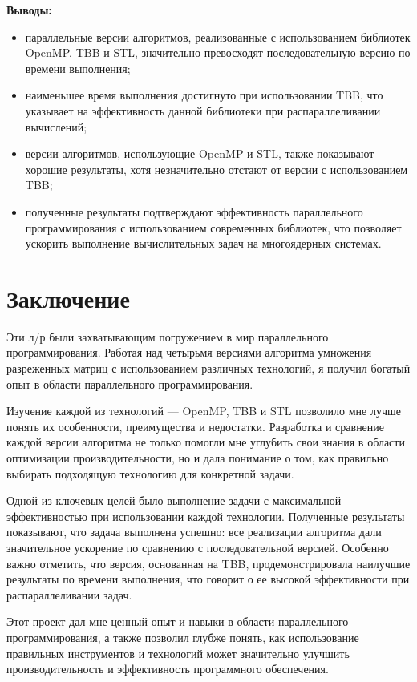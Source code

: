 \documentclass[a4paper, 14pt]{article}
\theoremstyle{plain}
\begin{document}
\textbf{Выводы:}
\vspace{-1em}
\begin{itemize}[leftmargin=3em]
	\setlength\itemsep{0cm}
	\item параллельные версии алгоритмов, реализованные с использованием библиотек OpenMP, TBB и STL, значительно превосходят последовательную версию по времени выполнения;
	\item наименьшее время выполнения достигнуто при использовании TBB, что указывает на эффективность данной библиотеки при распараллеливании вычислений;
	\item версии алгоритмов, использующие OpenMP и STL, также показывают хорошие результаты, хотя незначительно отстают от версии с использованием TBB;
	\item полученные результаты подтверждают эффективность параллельного программирования с использованием современных библиотек, что позволяет ускорить выполнение вычислительных задач на многоядерных системах.
\end{itemize}

\newpage
\section*{\centering Заключение}

Эти л/р были захватывающим погружением в мир параллельного программирования. Работая над четырьмя версиями алгоритма умножения разреженных матриц с использованием различных технологий, я получил богатый опыт в области параллельного программирования.

Изучение каждой из технологий --- OpenMP, TBB и STL позволило мне лучше понять их особенности, преимущества и недостатки. Разработка и сравнение каждой версии алгоритма не только помогли мне углубить свои знания в области оптимизации производительности, но и дала понимание о том, как правильно выбирать подходящую технологию для конкретной задачи.

Одной из ключевых целей было выполнение задачи с максимальной эффективностью при использовании каждой технологии. Полученные результаты показывают, что задача выполнена успешно: все реализации алгоритма дали значительное ускорение по сравнению с последовательной версией. Особенно важно отметить, что версия, основанная на TBB, продемонстрировала наилучшие результаты по времени выполнения, что говорит о ее высокой эффективности при распараллеливании задач.

Этот проект дал мне ценный опыт и навыки в области параллельного программирования, а также позволил глубже понять, как использование правильных инструментов и технологий может значительно улучшить производительность и эффективность программного обеспечения.
\end{document}
